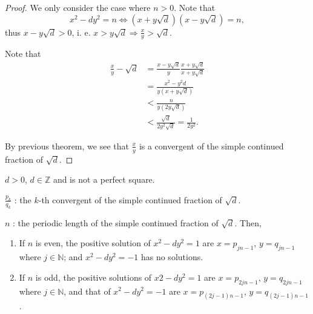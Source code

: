 \begin{proof}
    We only consider the case where $n>0$. Note that
    \[x^2-dy^2=n \Leftrightarrow \left(x+y\sqrt{d}\right)\left(x-y\sqrt{d}\right)=n,\]
    thus $x-y\sqrt{d}>0$, i. e. $x>y\sqrt{d} \Rightarrow \frac{x}{y}>\sqrt{d}$.

    Note that
    \begin{align*}
        \frac{x}{y}-\sqrt{d}&=\frac{x-y\sqrt{d}}{y}\frac{x+y\sqrt{d}}{x+y\sqrt{d}}\\
        &= \frac{x^2-y^2d}{y\left(x+y\sqrt{d}\right)} \\
        &< \frac{n}{y\left(2y\sqrt{d}\right)} \\
        &< \frac{\sqrt{d}}{2y^2\sqrt{d}} = \frac{1}{2y^2}.
    \end{align*}

    By previous theorem, we see that $\frac{x}{y}$ is a convergent of the
    simple continued fraction of $\sqrt{d}$.
\end{proof}

\begin{theorem}
    $d>0$, $d\in\mathbb{Z}$ and is not a perfect square.

    $\frac{p_k}{q_k}$ : the $k$-th convergent of the simple continued fraction of $\sqrt{d}$.

    $n$ : the periodic length of the simple continued fraction of $\sqrt{d}$. Then,
    \begin{enumerate}
        \item If $n$ is even, the positive solution of $x^2-dy^2=1$ are $x=p_{jn-1}$, $y=q_{jn-1}$
        where $j\in\mathbb{N}$; and $x^2-dy^2=-1$ has no solutions.
        \item If $n$ is odd, the positive solutions of $x2-dy^2=1$ are $x=p_{2jn-1}$, $y=q_{2jn-1}$
        where $j\in\mathbb{N}$, and that of $x^2-dy^2=-1$ are $x=p_{\left(2j-1\right)n-1}$,
        $y=q_{\left(2j-1\right)n-1}$.
    \end{enumerate}
\end{theorem}